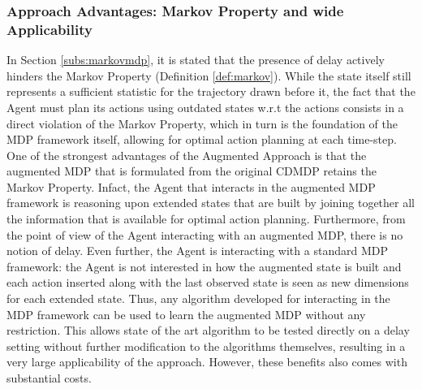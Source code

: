             \subsubsection{Approach Advantages: Markov Property and wide Applicability}
                In Section \ref{subs:markovmdp}, it is stated that the presence of delay actively hinders the Markov Property (Definition \ref{def:markov}). While the state itself still represents a sufficient statistic for the trajectory drawn before it, the fact that the Agent must plan its actions using outdated states w.r.t the actions consists in a direct violation of the Markov Property, which in turn is the foundation of the MDP framework itself, allowing for optimal action planning at each time-step. \newline
                One of the strongest advantages of the Augmented Approach is that the augmented MDP that is formulated from the original CDMDP retains the Markov Property. Infact, the Agent that interacts in the augmented MDP framework is reasoning upon extended states that are built by joining together all the information that is available for optimal action planning. Furthermore, from the point of view of the Agent interacting with an augmented MDP, there is no notion of delay. \newline
                Even further, the Agent is interacting with a standard MDP framework: the Agent is not interested in how the augmented state is built and each action inserted along with the last observed state is seen as new dimensions for each extended state. Thus, any algorithm developed for interacting in the MDP framework can be used to learn the augmented MDP without any restriction. This allows state of the art algorithm to be tested directly on a delay setting without further modification to the algorithms themselves, resulting in a very large applicability of the approach. However, these benefits also comes with substantial costs.
                

